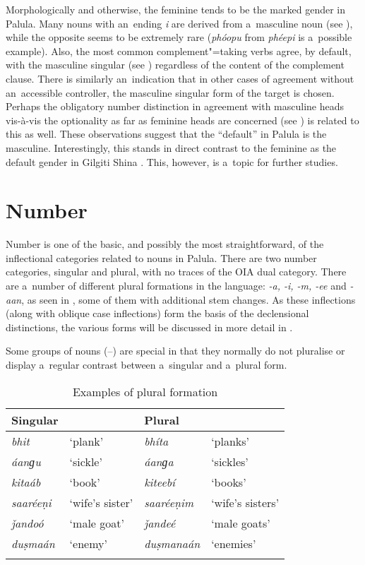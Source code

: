 Morphologically and otherwise, the feminine tends to be the marked gender in Palula. Many nouns with an~ending \textit{i} are derived from a~masculine noun (see ), while the opposite seems to be extremely rare (\textit{phóopu} from \textit{phéepi} is a~possible example). Also, the most common complement"=taking verbs agree, by default, with the masculine singular (see ) regardless of the content of the complement clause. There is similarly an~indication that in other cases of agreement without an~accessible controller, the masculine singular form of the target is chosen. Perhaps the obligatory number distinction in agreement with masculine heads vis-à-vis the optionality as far as feminine heads are concerned (see ) is related to this as well. These observations suggest that the ``default'' in Palula is the masculine. Interestingly, this stands in direct contrast to the feminine as the default gender in Gilgiti Shina \citep[176]{hookzia2005}. This, however, is a~topic for further studies.

\section{Number}
\label{sec:4-4}

Number is one of the basic, and possibly the most straightforward, of the inflectional categories related to nouns in Palula. There are two number categories, singular and plural, with no traces of the OIA dual category. There are a~number of different plural formations in the language: \textit{-a, -i, -m, -ee} and \textit{-aan}, as seen in , some of them with additional stem changes. As these inflections (along with oblique case inflections) form the basis of the declensional distinctions, the various forms will be discussed in more detail in . 

Some groups of nouns (--) are special in that they normally do not pluralise or display a~regular contrast between a~singular and a~plural form.



\begin{table}[ht]
\caption{Examples of plural formation}
\begin{tabularx}{\textwidth}{ Q Q Q Q }
\lsptoprule
Singular &
&
Plural &
\\\hline
\textit{bhit} &
`plank' &
\textit{bhíta} &
`planks'\\
\textit{áanɡu} &
`sickle' &
\textit{áanɡa} &
`sickles'\\
\textit{kitaáb} &
`book' &
\textit{kiteebí} &
`books'\\
\textit{saaréeṇi} &
`wife's sister' &
\textit{saaréeṇim} &
`wife's sisters'\\
\textit{ǰandoó} &
`male goat' &
\textit{ǰandeé} &
`male goats'\\
\textit{duṣmaán} &
`enemy' &
\textit{duṣmanaán} &
`enemies'\\\lspbottomrule
\end{tabularx}
\label{tab:4-5}
\end{table}


